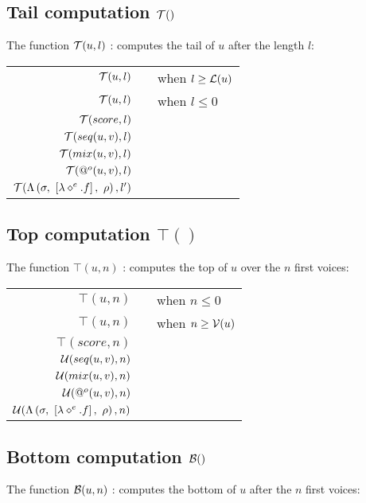 \documentclass[10pt,a4paper,frenchb]{article}
\makeatletter
\newcommand{\evaltable}[1][$\rightarrow$]	  {\begin{center} \begin{tabular*}{\linewidth}{rc@{ #1 }l}}
\newcommand{\evaltablend}  		{\end{tabular*}\end{center}}
\makeatother
\begin{document}
\subsection{Tail computation $\mathcal T()$}
The function $\mathcal T(u,l)$ :   computes the tail of $u$ after the length $l$:

\evaltable
 \hline
 $\mathcal T(u,l)$						& & \emptyScore \: when $l \geq \mathcal L(u)$ \\
 $\mathcal T(u,l)$						& & \identity{u} \: when $l \leq 0 $ \\
 $\mathcal T(score,l)$					& & \tailScore{score}{l} \\
 $\mathcal T(seq(u, v),l)$			& & \tailSeq{u}{v}{l} \\
 $\mathcal T(mix(u, v),l)$ 			& & \tailMix{u}{v}{l} \\
 $\mathcal T(@^o (u,v),l)$ 		& & \tailApply{u}{v}{l} \\
 $\mathcal T(\Lambda\left(\sigma,\ \left[\lambda \diamond^e.f\right],\ \rho \right),l')$ 	& & \tailClosure{e}{f}{\bounds}{l'} \\
 \hline
\evaltablend

\subsection{Top computation $\top()$}
The function $\top(u,n)$ :   computes the top of $u$ over the $n$ first voices:

\evaltable
 \hline
 $\top(u,n)$						& & \emptyScore \: when $n \leq 0$ \\
 $\top(u,n)$						& & \identity{u} \: when $n \geq \mathcal V(u) $ \\
 $\top(score,n)$					& & \topScore{score}{n} \\
 $\mathcal U(seq(u, v),n)$			& & \topSeq{u}{v}{n} \\
 $\mathcal U(mix(u, v),n)$ 			& & \topMix{u}{v}{n} \\
 $\mathcal U(@^o (u,v),n)$ 		& & \topApply{u}{v}{n} \\
 $\mathcal U(\Lambda\left(\sigma,\ \left[\lambda \diamond^e.f\right],\ \rho \right),n)$ 	& & \topClosure{e}{f}{\bounds}{n} \\
 \hline
\evaltablend

\subsection{Bottom computation $\mathcal B()$}
The function $\mathcal B(u,n)$ :   computes the bottom of $u$ after the $n$ first voices:
\end{document}
